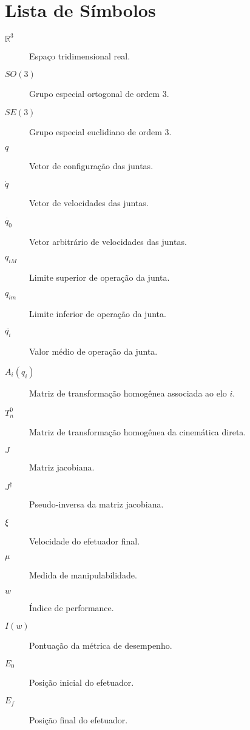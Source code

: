 \chapter*{Lista de Símbolos}

\begin{description}
    \item[$\mathbb{R}^3$] \quad Espaço tridimensional real.
    \item[$SO(3)$] \quad Grupo especial ortogonal de ordem 3.
    \item[$SE(3)$] \quad Grupo especial euclidiano de ordem 3.
    \item[$q$] \quad Vetor de configuração das juntas.
    \item[$\dot{q}$] \quad Vetor de velocidades das juntas.
    \item[$\dot{q_0}$] \quad Vetor arbitrário de velocidades das juntas.
    \item[$q_{iM}$] \quad Limite superior de operação da junta.
    \item[$q_{im}$] \quad Limite inferior de operação da junta.
    \item[$\bar{q_{i}}$] \quad Valor médio de operação da junta.
    \item[$A_i(q_i)$] \quad Matriz de transformação homogênea associada ao elo $i$.
    \item[$T^0_n$] \quad Matriz de transformação homogênea da cinemática direta.
    \item[$J$] \quad Matriz jacobiana.
    \item[$J^\dag$] \quad Pseudo-inversa da matriz jacobiana.
    \item[$\xi$] \quad Velocidade do efetuador final.
    \item[$\mu$] \quad Medida de manipulabilidade.
    \item[$w$] \quad Índice de performance.
    \item[$I(w)$] \quad Pontuação da métrica de desempenho.
    \item[$E_0$] \quad Posição inicial do efetuador.
    \item[$E_f$] \quad Posição final do efetuador.
\end{description}
